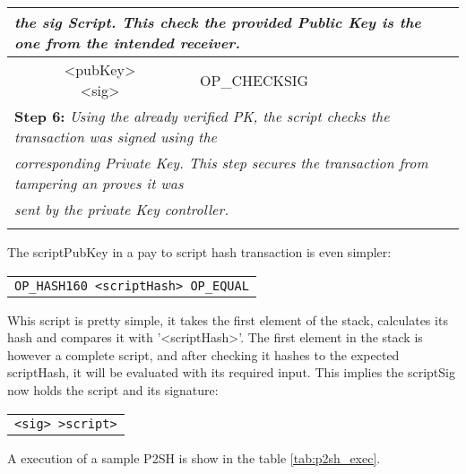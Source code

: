 \begin{table}[]
\begin{tabularx}{\textwidth}{| c | X |}
			\multicolumn{2}{|l|}{\textit{the sig Script. This check the provided Public Key is the one from the intended receiver.}} \\
			\hline
			\makecell{<pubKey> \\ <sig>} & OP\_CHECKSIG \\
			\hline
			\multicolumn{2}{|l|}{\textbf{Step 6: }\textit{Using the already verified PK, the script checks the transaction was signed using the}} \\
			\multicolumn{2}{|l|}{\textit{corresponding Private Key. This step secures the transaction from tampering an proves it was}} \\
			\multicolumn{2}{|l|}{\textit{sent by the private Key controller.}} \\
			\hline
			\makecell{True} & \\
			\hline
		\end{tabularx}
	\end{table}

The scriptPubKey in a pay to script hash transaction is even simpler:
\begin{center}
	\begin{tabular}{|c|}
		\texttt{OP\_HASH160 <scriptHash> OP\_EQUAL}
	\end{tabular}
\end{center}
Whis script is pretty simple, it takes the first element of the stack,
  calculates its hash and compares it with '<scriptHash>'. The first
  element in the stack is however a complete script, and after checking
  it hashes to the expected scriptHash, it will be evaluated with its
  required input. This implies the scriptSig now holds the script and
  its signature:

\begin{center}
	\begin{tabular}{|c|}
		\texttt{<sig> >script>}
	\end{tabular}
\end{center}


  A execution of a sample P2SH is show in the table \ref{tab:p2sh_exec}.

